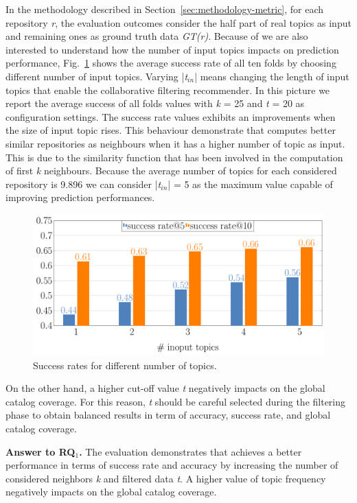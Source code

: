 In the methodology described in Section~\ref{sec:methodology-metric}, for each repository \emph{r}, the evaluation outcomes consider the half part of real topics as input and remaining ones as ground truth data \emph{GT(r)}. Because of we are also interested to understand how the number of input topics impacts on prediction performance, Fig.~\ref{fig:pr-input-topics} shows the average success rate of all ten folds by choosing different number of input topics. Varying |\emph{t$_{in}$}| means changing the length of input topics that enable the \TF collaborative filtering recommender. In this picture we report the average success of all folds values with \emph{k} = 25 and \emph{t} = 20 as configuration settings. The success rate values exhibits an improvements when the size of input topic rises. This  behaviour demonstrate that \TF computes better similar repositories as neighbours when it has a higher number of topic as input. This is due to the similarity function that has been involved in the computation of first  \emph{k} neighbours. Because the average number of topics for each considered repository is 9.896 we can consider |\emph{t$_{in}$}| = 5 as the maximum value capable of improving prediction performances.
\begin{figure}[t!]
	\centering
	\includegraphics[width=0.9\linewidth]{figs/successRate_inputTopic.pdf}
	\caption{Success rates for different number of topics.}
	\label{fig:pr-input-topics}
\end{figure} 



On the other hand, a higher cut-off value \emph{t} negatively impacts on the global catalog coverage. For this reason, \emph{t} should be careful selected during the filtering phase to obtain balanced results in term of accuracy, success rate, and global catalog coverage.

\begin{tcolorbox}[boxrule=0.86pt,left=0.3em, right=0.3em,top=0.1em, bottom=0.05em]
\textbf{Answer to RQ$_1$.} The evaluation demonstrates that \TF achieves a better performance in terms of success rate and accuracy by increasing the number of considered neighbors \emph{k} and filtered data \emph{t}. %
A higher value of topic frequency negatively impacts on the global catalog coverage.
\end{tcolorbox}


